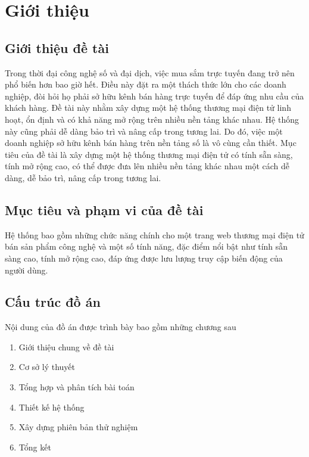 \chapter{Giới thiệu}


\section{Giới thiệu đề tài}
\noindent Trong thời đại công nghệ số và đại dịch, việc mua sắm trực tuyến đang trở nên phổ biến hơn bao giờ hết. Điều này đặt ra một thách thức lớn cho các doanh nghiệp, đòi hỏi họ phải sở hữu kênh bán hàng trực tuyến để đáp ứng nhu cầu của khách hàng. Đề tài này nhằm xây dựng một hệ thống thương mại điện tử linh hoạt, ổn định và có khả năng mở rộng trên nhiều nền tảng khác nhau. Hệ thống này cũng phải dễ dàng bảo trì và nâng cấp trong tương lai. Do đó, việc một doanh nghiệp sở hữu kênh bán hàng trên nền tảng số là vô cùng cần thiết. Mục tiêu của đề tài là xây dựng một hệ thống thương mại điện tử có tính sẵn sàng, tính mở rộng cao, có thể được đưa lên nhiều nền tảng khác nhau một cách dễ dàng, dễ bảo trì, nâng cấp trong tương lai.

\section{Mục tiêu và phạm vi của đề tài}
\noindent Hệ thống bao gồm những chức năng chính cho một trang web thương mại điện tử bán sản phẩm công nghệ và một số tính năng, đặc điểm nổi bật như tính sẵn sàng cao, tính mở rộng cao, đáp ứng được lưu lượng truy cập biến động của người dùng.

\section{Cấu trúc đồ án}
\noindent Nội dung của đồ án được trình bày bao gồm những chương sau

\begin{enumerate}[label=\Roman*., itemsep=0pt, start=1]
    \item Giới thiệu chung về đề tài
    \item Cơ sở lý thuyết
    \item Tổng hợp và phân tích bài toán
    \item Thiết kế hệ thống
    \item Xây dựng phiên bản thử nghiệm
    \item Tổng kết
\end{enumerate}